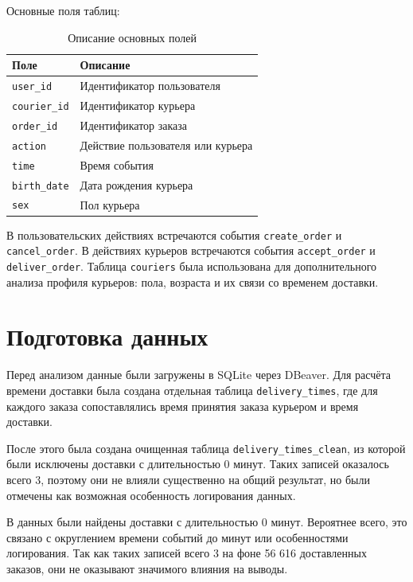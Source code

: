 \documentclass[12pt,a4paper]{article}
\begin{document}
Основные поля таблиц:

\begin{table}[H]
\centering
\caption{Описание основных полей}
\begin{tabular}{p{4cm} p{10cm}}
\toprule
\textbf{Поле} & \textbf{Описание} \\
\midrule
\texttt{user\_id} & Идентификатор пользователя \\
\texttt{courier\_id} & Идентификатор курьера \\
\texttt{order\_id} & Идентификатор заказа \\
\texttt{action} & Действие пользователя или курьера \\
\texttt{time} & Время события \\
\texttt{birth\_date} & Дата рождения курьера \\
\texttt{sex} & Пол курьера \\
\bottomrule
\end{tabular}
\end{table}

В пользовательских действиях встречаются события \texttt{create\_order} и \texttt{cancel\_order}. В действиях курьеров встречаются события \texttt{accept\_order} и \texttt{deliver\_order}. Таблица \texttt{couriers} была использована для дополнительного анализа профиля курьеров: пола, возраста и их связи со временем доставки.

\section{Подготовка данных}

Перед анализом данные были загружены в SQLite через DBeaver. Для расчёта времени доставки была создана отдельная таблица \texttt{delivery\_times}, где для каждого заказа сопоставлялись время принятия заказа курьером и время доставки.

После этого была создана очищенная таблица \texttt{delivery\_times\_clean}, из которой были исключены доставки с длительностью 0 минут. Таких записей оказалось всего 3, поэтому они не влияли существенно на общий результат, но были отмечены как возможная особенность логирования данных.

В данных были найдены доставки с длительностью 0 минут. Вероятнее всего, это связано с округлением времени событий до минут или особенностями логирования. Так как таких записей всего 3 на фоне 56 616 доставленных заказов, они не оказывают значимого влияния на выводы.
\end{document}
